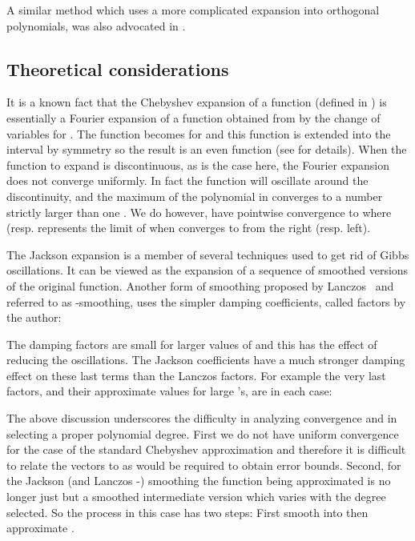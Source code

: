\documentclass[12pt]{article}		\usepackage{tabls,multirow}
\begin{document}
A similar method which uses a more complicated expansion into
orthogonal polynomials, was also advocated in \cite{saad-filt}.

\subsection{Theoretical considerations}\label{sec:Analysis}
It is a known fact that the Chebyshev expansion of a function 
(defined in ) is essentially a Fourier expansion of a
function obtained from  by the change of variables  for .  The function  becomes
 for  and this function is
extended into the interval  by symmetry so the result
is an even function (see \cite[sec.  2.4]{Rivlin} for details). When
the function to expand is discontinuous, as is the case here, the
Fourier expansion does not converge uniformly. In fact the function
will oscillate around the discontinuity, and the maximum of the
polynomial in  converges to a number strictly larger than
one \cite{Angot}.  We do however, have pointwise convergence to
 where  (resp.  represents the
limit of  when  converges to  from the right (resp. left).

The Jackson expansion is a member of several techniques 
used to get rid of Gibbs oscillations. 
It can be viewed as the expansion of a 
sequence of smoothed versions of the original
function. 
Another form of smoothing proposed by Lanczos~\cite[Chap. 4]{Lanczos-book} and
referred to as -smoothing,
uses the   simpler damping coefficients, called 
  factors by the author:
 

The damping factors are small for larger values of  and this has the
effect of reducing the oscillations. The Jackson coefficients have a much
stronger damping effect on these  last terms than the Lanczos  factors.
 For example the 
very last factors, and their approximate values for large 's,  are  in each case:
 

The above discussion underscores the difficulty in analyzing
convergence and in selecting a proper polynomial degree.  First we do
not have uniform convergence for the case of the standard Chebyshev
approximation and therefore it is difficult to relate the vectors
 to  as would be required to obtain error bounds.
Second, for the Jackson (and Lanczos -) smoothing the function
being approximated is no longer just  but a smoothed intermediate
version  which varies with the degree  selected.  So the
process in this case has two steps: First smooth  into 
then approximate .
\end{document}
